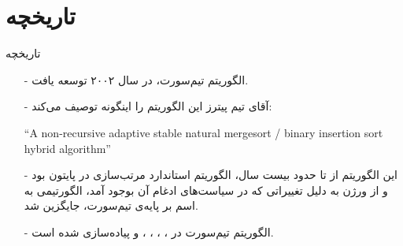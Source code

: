 \section{تاریخچه}
\begin{frame}{تاریخچه}
\begin{itemize}\itemr
\item[-]
الگوریتم تیم‌سورت، در سال ۲۰۰۲ توسعه یافت.

\item[-]
آقای تیم‌ پیترز این الگوریتم را اینگونه توصیف می‌کند:
\begin{flushleft}
\begin{latin}
``A non-recursive adaptive stable natural mergesort / binary insertion sort hybrid algorithm''
\end{latin}
\end{flushleft}

\item[-]
این الگوریتم از 
تا حدود بیست سال، الگوریتم استاندارد مرتب‌سازی در پایتون بود و از ورژن 
به دلیل تغییراتی که در سیاست‌های ادغام آن بوجود آمد، الگورتیمی به اسم 
بر پایه‌ی تیم‌سورت، جایگزین شد.

\item[-]
الگوریتم تیم‌سورت در 
،
،
،
،
 و 
پیاده‌سازی شده است.
\end{itemize}
\end{frame}